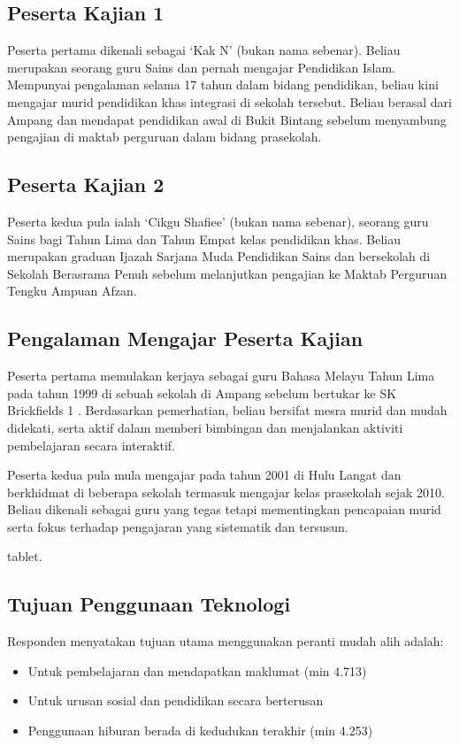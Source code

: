 {{\subsection{Peserta Kajian 1}
Peserta pertama dikenali sebagai ‘Kak N’ (bukan nama sebenar). Beliau merupakan seorang guru Sains dan pernah mengajar Pendidikan Islam. Mempunyai pengalaman selama 17 tahun dalam bidang pendidikan, beliau kini mengajar murid pendidikan khas integrasi di sekolah tersebut. Beliau berasal dari Ampang dan mendapat pendidikan awal di Bukit Bintang sebelum menyambung pengajian di maktab perguruan dalam bidang prasekolah.

\subsection{Peserta Kajian 2}
Peserta kedua pula ialah ‘Cikgu Shafiee’ (bukan nama sebenar), seorang guru Sains bagi Tahun Lima dan Tahun Empat kelas pendidikan khas. Beliau merupakan graduan Ijazah Sarjana Muda Pendidikan Sains dan bersekolah di Sekolah Berasrama Penuh sebelum melanjutkan pengajian ke Maktab Perguruan Tengku Ampuan Afzan.



\subsection{Pengalaman Mengajar Peserta Kajian}
Peserta pertama memulakan kerjaya sebagai guru Bahasa Melayu Tahun Lima pada tahun 1999 di sebuah sekolah di Ampang sebelum bertukar ke SK Brickfields 1 . Berdasarkan pemerhatian, beliau bersifat mesra murid dan mudah didekati, serta aktif dalam memberi bimbingan dan menjalankan aktiviti pembelajaran secara interaktif.

Peserta kedua pula mula mengajar pada tahun 2001 di Hulu Langat dan berkhidmat di beberapa sekolah termasuk mengajar kelas prasekolah sejak 2010. Beliau dikenali sebagai guru yang tegas tetapi mementingkan pencapaian murid serta fokus terhadap pengajaran yang sistematik dan tersusun.

\clearpage
tablet.

\subsection{ Tujuan Penggunaan Teknologi}

Responden menyatakan tujuan utama menggunakan peranti mudah alih adalah:

\begin{itemize}
    \item Untuk pembelajaran dan mendapatkan maklumat (min 4.713)
    \item Untuk urusan sosial dan pendidikan secara berterusan
    \item Penggunaan hiburan berada di kedudukan terakhir (min 4.253)
\end{itemize}

}}
